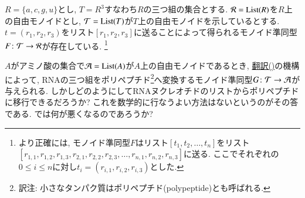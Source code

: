 \begin{application}\label{app:RNA reader 1}


$R=\{a,c,g,u\}$とし, $T=R^3$すなわち$R$の三つ組の集合とする. $\mcR=\List(R)$を$R$上の自由モノイドとし, $\mcT=\List(T)$が$T$上の自由モノイドを示しているとする. $t=(r_1,r_2,r_3)$をリスト$[r_1,r_2,r_3]$に送ることによって得られるモノイド準同型$F\colon\mathcal{T}\rightarrow\mathcal{R}$が存在している.
\footnote{より正確には, モノイド準同型$F$はリスト$[t_1, t_2, \ldots, t_n]$をリスト$[r_{1,1}, r_{1,2}, r_{1,3}, r_{2,1}, r_{2,2}, r_{2,3},\allowbreak \ldots,\allowbreak r_{n,1}, r_{n,2}, r_{n,3}]$に送る. ここでそれぞれの$0\leq i\leq n$に対し$t_i=(r_{i,1}, r_{i,2}, r_{i,3})$とした.}


$A$がアミノ酸の集合で$\mcA=\List(A)$が$A$上の自由モノイドであるとき, \href{http://en.wikipedia.org/wiki/Translation_(biology)}{翻訳()}の機構によって, RNAの三つ組をポリペプチド\footnote{訳注: 小さなタンパク質はポリペプチド(polypeptide)とも呼ばれる.}へ変換するモノイド準同型$G\colon\mathcal{T}\rightarrow\mathcal{A}$が与えられる. しかしどのようにしてRNAヌクレオチドのリストからポリペプチドに移行できるだろうか? これを数学的に行なうよい方法はないというのがその答である. では何が悪くなるのであろうか?



\end{application}
